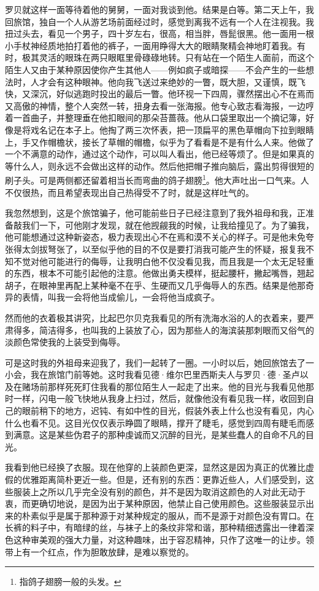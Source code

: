 \par 罗贝就这样一面等待着他的舅舅，一面对我谈到他。结果是白等。第二天上午，我回旅馆，独自一个人从游艺场前面经过时，感觉到离我不远有一个人在注视我。我扭过头去，看见一个男子，四十岁左右，很高，相当胖，唇髭很黑。他一面用一根小手杖神经质地拍打着他的裤子，一面用睁得大大的眼睛聚精会神地盯着我。有时，极其灵活的眼珠在两只眼眶里骨碌碌地转。只有站在一个陌生人面前，而这个陌生人又由于某种原因使你产生其他人——例如疯子或暗探——不会产生的一些想法时，人才会有这种眼神。他向我飞送过来绝妙的一瞥，既大胆，又谨慎，既飞快，又深沉，好似逃跑时投出的最后一瞥。他环视一下四周，骤然摆出心不在焉而又高傲的神情，整个人突然一转，扭身去看一张海报。他专心致志看海报，一边哼着一首曲子，并整理垂在他扣眼间的那朵苔蔷薇。他从口袋里取出一个摘记簿，好像是将戏名记在本子上。他掏了两三次怀表，把一顶扁平的黑色草帽向下拉到眼睛上，手又作帽檐状，接长了草帽的帽檐，似乎为了看看是不是有什么人来。他做了一个不满意的动作，通过这个动作，可以叫人看出，他已经等烦了。但是如果真的等什么人，则永远不会做出这样的动作。然后他把帽子推向脑后，露出剪得很短的刷子头。可是两侧都还留着相当长而弯曲的鸽子翅膀\footnote{指鸽子翅膀一般的头发。}。他大声吐出一口气来。人不仅很热，而且希望表现出自己热得受不了时，就是这样吐气的。
\par 我忽然想到，这是个旅馆骗子，他可能前些日子已经注意到了我外祖母和我，正准备敲我们一下，可他刚才发现，就在他觊觎我的时候，让我给撞见了。为了骗我，他可能想通过这种新姿态，极力表现出心不在焉和漠不关心的样子。可是他未免夸张得太剑拔弩张了，以至似乎他的目的不仅是要打消我可能产生的怀疑，报复我不知不觉对他可能进行的侮辱，让我明白他不仅没看见我，而且我是一个太无足轻重的东西，根本不可能引起他的注意。他做出勇夫模样，挺起腰杆，撇起嘴唇，翘起胡子，在眼神里再配上某种毫不在乎、生硬而又几乎侮辱人的东西。结果是他那奇异的表情，叫我一会将他当成偷儿，一会将他当成疯子。
\par 然而他的衣着极其讲究，比起巴尔贝克我看见的所有洗海水浴的人的衣着来，要严肃得多，简洁得多，也叫我的上装放了心，因为那些人的海滨装那刺眼而又俗气的淡颜色常使我的上装受到侮辱。
\par 可是这时我的外祖母来迎我了，我们一起转了一圈。一小时以后，她回旅馆去了一小会，我在旅馆门前等她。这时我看见德·维尔巴里西斯夫人与罗贝·德·圣卢以及在赌场前那样死死盯住我看的那位陌生人一起走了出来。他的目光与我看见他那时一样，闪电一般飞快地从我身上扫过，然后，就像他没有看见我一样，收回到自己的眼前稍下的地方，迟钝、有如中性的目光，假装外表上什么也没有看见，内心什么也看不见。这目光仅仅表示睁圆了眼睛，撑开了睫毛，感觉到四周有睫毛而感到满意。这是某些伪君子的那种虔诚而又沉醉的目光，是某些蠢人的自命不凡的目光。
\par 我看到他已经换了衣服。现在他穿的上装颜色更深，显然这是因为真正的优雅比虚假的优雅距离简朴更近一些。但是，还有别的东西：更靠近些人，人们感受到，这些服装上之所以几乎完全没有别的颜色，并不是因为取消这颜色的人对此无动于衷，而更确切地说，是因为出于某种原因，他禁止自己使用颜色。这些服装显示出来的朴素似乎是属于那种源于对某种规定的服从，而不是源于对颜色没有胃口。在长裤的料子中，有暗绿的丝，与袜子上的条纹非常和谐，那种精细透露出一律着深色这种审美观的强大力量，对这种趣味，出于容忍精神，只作了这唯一的让步。领带上有一个红点，作为胆敢放肆，是难以察觉的。
